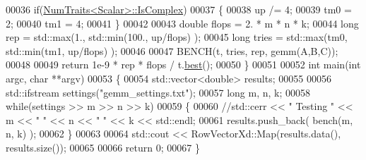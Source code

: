 \begin{DoxyCode}
00036   \textcolor{keywordflow}{if}(\hyperlink{group___core___module_struct_eigen_1_1_num_traits}{NumTraits<Scalar>::IsComplex})
00037   \{
00038     up /= 4;
00039     tm0 = 2;
00040     tm1 = 4;
00041   \}
00042   
00043   \textcolor{keywordtype}{double} flops = 2. * m * n * k;
00044   \textcolor{keywordtype}{long} rep = std::max(1., std::min(100., up/flops) );
00045   \textcolor{keywordtype}{long} tries = std::max(tm0, std::min(tm1, up/flops) );
00046   
00047   BENCH(t, tries, rep, gemm(A,B,C));
00048   
00049   \textcolor{keywordflow}{return} 1e-9 * rep * flops / t.\hyperlink{class_eigen_1_1_bench_timer_ae8b673b0fa356d3432c7a65c79e8af0e}{best}();
00050 \}
00051 
00052 \textcolor{keywordtype}{int} main(\textcolor{keywordtype}{int} argc, \textcolor{keywordtype}{char} **argv)
00053 \{
00054   std::vector<double> results;
00055   
00056   std::ifstream settings(\textcolor{stringliteral}{"gemm\_settings.txt"});
00057   \textcolor{keywordtype}{long} m, n, k;
00058   \textcolor{keywordflow}{while}(settings >> m >> n >> k)
00059   \{
00060     \textcolor{comment}{//std::cerr << "  Testing " << m << " " << n << " " << k << std::endl;}
00061     results.push\_back( bench(m, n, k) );
00062   \}
00063   
00064   std::cout << RowVectorXd::Map(results.data(), results.size());
00065   
00066   \textcolor{keywordflow}{return} 0;
00067 \}
\end{DoxyCode}
